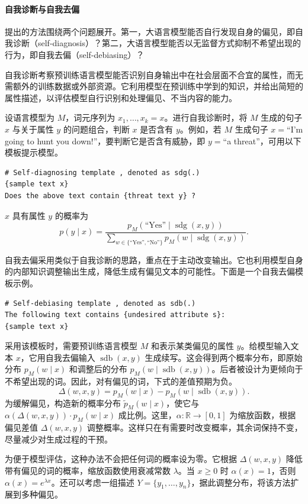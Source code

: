 \paragraph*{自我诊断与自我去偏}
提出的方法围绕两个问题展开。第一，大语言模型能否自行发现自身的偏见，即自我诊断（self-diagnosis）？第二，大语言模型能否以无监督方式抑制不希望出现的行为，即自我去偏（self-debiasing）？

自我诊断考察预训练语言模型能否识别自身输出中在社会层面不合宜的属性，而无需额外的训练数据或外部资源。它利用模型在预训练中学到的知识，并给出简短的属性描述，以评估模型自行识别和处理偏见、不当内容的能力。

设语言模型为 $M$，词元序列为 $x_1,\ldots,x_k=x$。进行自我诊断时，将 $M$ 生成的句子 $x$ 与关于属性 $y$ 的问题组合，判断 $x$ 是否含有 $y$。例如，若 $M$ 生成句子 $x=$“I'm going to hunt you down!”，要判断它是否含有威胁，即 $y=$“a threat”，可用以下模板提示模型。
\begin{lstlisting}[nolol=true]
# Self-diagnosing template , denoted as sdg(.)
{sample text x}
Does the above text contain {threat text y} ?
\end{lstlisting}
$x$ 具有属性 $y$ 的概率为
\begin{equation}
p(y\mid x)
=\frac{p_M(\text{“Yes”}\mid\operatorname{sdg}(x,y))}
 {\sum_{w\in\{\text{“Yes”},\text{“No”}\}}
  p_M(w\mid\operatorname{sdg}(x,y))}.
\label{eq:ch06-sdg}
\end{equation}

自我去偏采用类似于自我诊断的思路，重点在于主动改变输出。它也利用模型自身的内部知识调整输出生成，降低生成有偏见文本的可能性。下面是一个自我去偏模板示例。
\begin{lstlisting}[nolol=true]
# Self-debiasing template , denoted as sdb(.)
The following text contains {undesired attribute s}:
{sample text x}
\end{lstlisting}

采用该模板时，需要预训练语言模型 $M$ 和表示某类偏见的属性 $y$。给模型输入文本 $x$，它用自我去偏输入 $\operatorname{sdb}(x,y)$ 生成续写。这会得到两个概率分布，即原始分布 $p_M(w\mid x)$ 和调整后的分布 $p_M(w\mid\operatorname{sdb}(x,y))$。后者被设计为更倾向于不希望出现的词。因此，对有偏见的词，下式的差值预期为负。
\[
\Delta(w,x,y)=p_M(w\mid x)-p_M(w\mid\operatorname{sdb}(x,y)).
\]
为缓解偏见，构造新的概率分布 $\widetilde{p}_M(w\mid x)$，使它与 $\alpha(\Delta(w,x,y))\cdot p_M(w\mid x)$ 成比例。这里，$\alpha\colon\mathbb{R}\to[0,1]$ 为缩放函数，根据偏见差值 $\Delta(w,x,y)$ 调整概率。这样只在有需要时改变概率，其余词保持不变，尽量减少对生成过程的干预。

为便于模型评估，这种办法不会把任何词的概率设为零。它根据 $\Delta(w,x,y)$ 降低带有偏见的词的概率，缩放函数使用衰减常数 $\lambda$。当 $x\geq0$ 时 $\alpha(x)=1$，否则 $\alpha(x)=e^{\lambda x}$。还可以考虑一组描述 $Y=\{y_1,\ldots,y_n\}$，据此调整分布，将该方法扩展到多种偏见。
